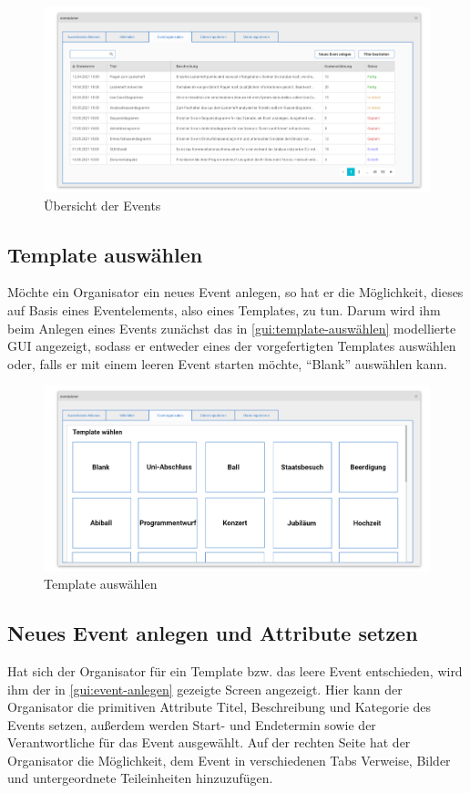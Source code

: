 \begin{figure}[ht!]
    \centering
    \includegraphics[width=0.98\columnwidth]{Bilder/mockup_eventorganisation.png}
    \caption{Übersicht der Events}
    \label{gui:übersicht-events}
\end{figure}
\newpage
\FloatBarrier
\subsection{Template auswählen}
Möchte ein Organisator ein neues Event anlegen, so hat er die Möglichkeit, dieses auf Basis eines Eventelements, also eines Templates, zu tun. Darum wird ihm beim Anlegen eines Events zunächst das in \autoref{gui:template-auswählen} modellierte GUI angezeigt, sodass er entweder eines der vorgefertigten Templates auswählen oder, falls er mit einem leeren Event starten möchte, \enquote{Blank} auswählen kann.

\begin{figure}[ht!]
    \centering
    \includegraphics[width=0.98\columnwidth]{Bilder/mockup_neues_event_anlegen_templateauswahl.png}
    \caption{Template auswählen}
    \label{gui:template-auswählen}
\end{figure}

\newpage
\subsection{Neues Event anlegen und Attribute setzen}
Hat sich der Organisator für ein Template bzw. das leere Event entschieden, wird ihm der in \autoref{gui:event-anlegen} gezeigte Screen angezeigt. Hier kann der Organisator die primitiven Attribute Titel, Beschreibung und Kategorie des Events setzen, außerdem werden Start- und Endetermin sowie der Verantwortliche für das Event ausgewählt. Auf der rechten Seite hat der Organisator die Möglichkeit, dem Event in verschiedenen Tabs Verweise, Bilder und untergeordnete Teileinheiten hinzuzufügen.

